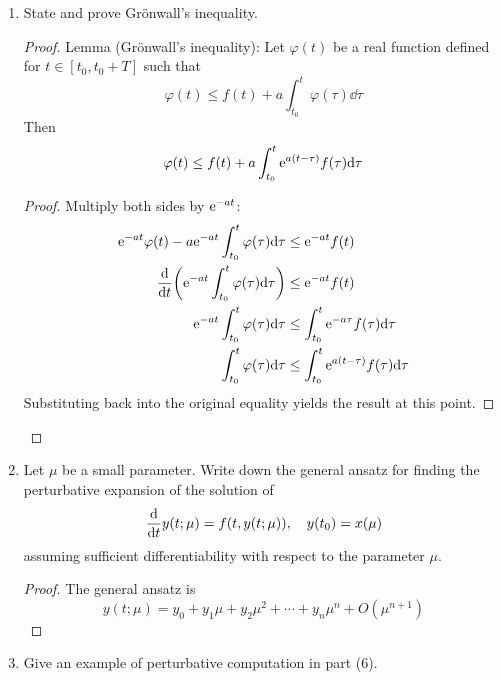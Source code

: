 \documentclass[../psets.tex]{subfiles}
\begin{document}
\begin{enumerate}
\begin{proof}
\begin{proof}
        \end{proof}
    \end{proof}
    \item State and prove Gr\"{o}nwall's inequality.
    \begin{proof}
        Lemma (Gr\"{o}nwall's inequality): Let $\varphi(t)$ be a real function defined for $t\in[t_0,t_0+T]$ such that
        \begin{equation*}
            \varphi(t) \leq f(t)+a\int_{t_0}^t\varphi(\tau)\dd\tau
        \end{equation*}
        Then
        \begin{equation*}
            \varphi(t) \leq f(t)+a\int_{t_0}^t\e[a(t-\tau)]f(\tau)\dd\tau
        \end{equation*}
        \begin{proof}
            Multiply both sides by $\e[-at]$:
            \begin{align*}
                \e[-at]\varphi(t)-a\e[-at]\int_{t_0}^t\varphi(\tau)\dd\tau &\leq \e[-at]f(t)\\
                \dv{t}(\e[-at]\int_{t_0}^t\varphi(\tau)\dd\tau) &\leq \e[-at]f(t)\\
                \e[-at]\int_{t_0}^t\varphi(\tau)\dd\tau &\leq \int_{t_0}^t\e[-a\tau]f(\tau)\dd\tau\\
                \int_{t_0}^t\varphi(\tau)\dd\tau &\leq \int_{t_0}^t\e[a(t-\tau)]f(\tau)\dd\tau
            \end{align*}
            Substituting back into the original equality yields the result at this point.
        \end{proof}
    \end{proof}
    \item Let $\mu$ be a small parameter. Write down the general ansatz for finding the perturbative expansion of the solution of
    \begin{equation*}
        \dv{t}y(t;\mu) = f(t,y(t;\mu))
        ,\quad
        y(t_0) = x(\mu)
    \end{equation*}
    assuming sufficient differentiability with respect to the parameter $\mu$.
    \begin{proof}
        The general ansatz is
        \begin{equation*}
            y(t;\mu) = y_0+y_1\mu+y_2\mu^2+\cdots+y_n\mu^n+O(\mu^{n+1})
        \end{equation*}
    \end{proof}
    \item Give an example of perturbative computation in part (6).

\end{enumerate}
\end{document}
